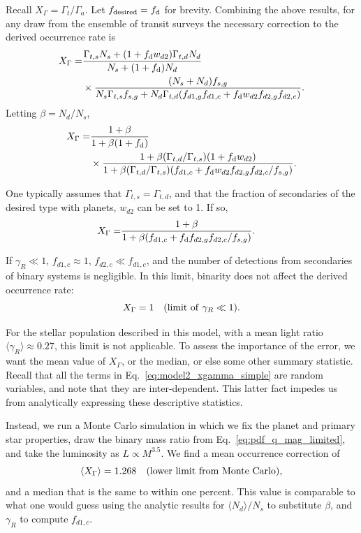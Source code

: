 \documentclass{emulateapj}
\begin{document}
Recall $X_\Gamma = \Gamma_t / \Gamma_a$. Let $f_{\rm desired} = f_{\rm d}$ for 
brevity.
Combining the above results, for any draw from the ensemble of transit 
surveys the necessary correction to the derived occurrence rate is
\begin{align}
X_\Gamma =
&\frac{\Gamma_{t,s}N_s + (1+f_{\rm d}w_{d2})\Gamma_{t,d}N_d }{N_s + (1+f_{\rm 
d})N_d}
\nonumber \\
&\times
\frac{(N_s + N_d)f_{s,g}}{N_s \Gamma_{t,s} f_{s,g} + N_d \Gamma_{t,d}
      (f_{d1,g}f_{d1,c} + f_{\rm d}w_{d2}f_{d2,g}f_{d2,c})  }.
\end{align}
Letting $\beta = N_d/N_s$, 
\begin{align}
X_\Gamma =
&\frac{1+\beta}{1 + \beta(1+f_{\rm d})} 
\nonumber \\
&\times
\frac{ 1+ \beta (\Gamma_{t,d}/\Gamma_{t,s}) (1+f_{\rm d}w_{d2}) }
{1 +\beta(\Gamma_{t,d}/\Gamma_{t,s})(f_{d1,c} + f_{\rm 
d}w_{d2}f_{d2,g}f_{d2,c}/f_{s,g})}.
\end{align}

One typically assumes that $\Gamma_{t,s}=\Gamma_{t,d}$, and that the 
fraction of secondaries of the desired type with planets, $w_{d2}$ can be set 
to 1.
If so,
\begin{align}
X_\Gamma =
&\frac{1+\beta}
{1 +\beta(f_{d1,c} + f_{\rm d}f_{d2,g}f_{d2,c}/f_{s,g})}.
\label{eq:model2_xgamma_simple}
\end{align}

If $\gamma_R \ll 1$, $f_{d1,c}\approx 1$, $f_{d2,c}\ll f_{d1,c}$, and the 
number of detections from secondaries of binary systems is negligible.
In this limit, binarity does not affect the derived occurrence rate:
\begin{equation}
X_\Gamma = 1 \quad ({\rm limit\ of}\ \gamma_R \ll 1).
\end{equation}

For the stellar population described in this model, with a mean light ratio 
$\langle \gamma_R \rangle \approx 0.27$, this limit is not applicable.
To assess the importance of the error, we want the mean
value of $X_\Gamma$, or the median, or else some other summary statistic.
Recall that all the terms in Eq.~\ref{eq:model2_xgamma_simple} are
random variables, and note that they are inter-dependent.
This latter fact impedes us from analytically expressing these 
descriptive statistics.

Instead, we run a Monte Carlo simulation in which we fix the planet and 
primary star properties, draw the binary mass ratio from 
Eq.~\ref{eq:pdf_q_mag_limited}, 
and take the luminosity as $L\propto M^{3.5}$. We find a mean occurrence 
correction of 
\begin{equation}
\langle X_\Gamma \rangle =1.268\quad ({\rm lower\ limit\ from\ Monte\ Carlo}),
\label{eq:X_Gamma_model2_lower}
\end{equation}
and a median that is the same to within one percent.
This value is comparable to what one would guess using the analytic results 
for $\langle N_d \rangle / N_s$ to substitute $\beta$, and $\gamma_R$ to 
compute $f_{d1,c}$.
\end{document}
